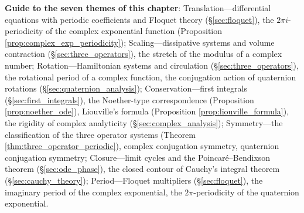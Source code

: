 \begin{remark}
\textbf{Guide to the seven themes of this chapter}: Translation---differential equations with periodic coefficients and Floquet theory (\S\ref{sec:floquet}), the $2\pi i$-periodicity of the complex exponential function (Proposition \ref{prop:complex_exp_periodicity}); Scaling---dissipative systems and volume contraction (\S\ref{sec:three_operators}), the stretch of the modulus of a complex number; Rotation---Hamiltonian systems and circulation (\S\ref{sec:three_operators}), the rotational period of a complex function, the conjugation action of quaternion rotations (\S\ref{sec:quaternion_analysis}); Conservation---first integrals (\S\ref{sec:first_integrals}), the Noether-type correspondence (Proposition \ref{prop:noether_ode}), Liouville's formula (Proposition \ref{prop:liouville_formula}), the rigidity of complex analyticity (\S\ref{sec:complex_analysis}); Symmetry---the classification of the three operator systems (Theorem \ref{thm:three_operator_periodic}), complex conjugation symmetry, quaternion conjugation symmetry; Closure---limit cycles and the Poincaré--Bendixson theorem (\S\ref{sec:ode_phase}), the closed contour of Cauchy's integral theorem (\S\ref{sec:cauchy_theory}); Period---Floquet multipliers (\S\ref{sec:floquet}), the imaginary period of the complex exponential, the $2\pi$-periodicity of the quaternion exponential.
\end{remark}


